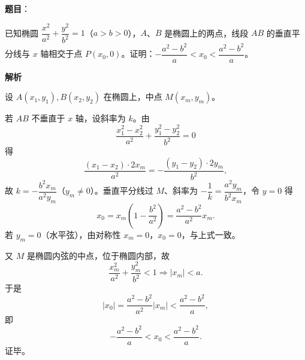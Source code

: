 \begin{answer}

\textbf{题目}：

已知椭圆 \(\dfrac{x^{2}}{a^{2}}+\dfrac{y^{2}}{b^{2}}=1\)（\(a>b>0\)），\(A\)、\(B\) 是椭圆上的两点，线段 \(AB\) 的垂直平分线与 \(x\) 轴相交于点 \(P(x_0,0)\)。证明：\(-\dfrac{a^{2}-b^{2}}{a}<x_0<\dfrac{a^{2}-b^{2}}{a}\)。

\textbf{解析}

设 \(A(x_1,y_1),B(x_2,y_2)\) 在椭圆上，中点 \(M(x_m,y_m)\)。

若 \(AB\) 不垂直于 \(x\) 轴，设斜率为 \(k\)。由
\nopagebreak[4]
\[
\frac{x_1^2-x_2^2}{a^2}+\frac{y_1^2-y_2^2}{b^2}=0
\]
得
\nopagebreak[4]
\[
\frac{(x_1-x_2)\cdot2x_m}{a^2}
=-\frac{(y_1-y_2)\cdot2y_m}{b^2},
\]
故 \(k=-\dfrac{b^2x_m}{a^2y_m}\)（\(y_m\neq0\)）。垂直平分线过 \(M\)、斜率为 \(-\dfrac1k=\dfrac{a^2y_m}{b^2x_m}\)，令 \(y=0\) 得
\nopagebreak[4]
\[
x_0=x_m\left(1-\frac{b^2}{a^2}\right)=\frac{a^2-b^2}{a^2}x_m.
\]
若 \(y_m=0\)（水平弦），由对称性 \(x_m=0\)，\(x_0=0\)，与上式一致。

又 \(M\) 是椭圆内弦的中点，位于椭圆内部，故
\nopagebreak[4]
\[
\frac{x_m^2}{a^2}+\frac{y_m^2}{b^2}<1
\Rightarrow |x_m|<a.
\]
于是
\nopagebreak[4]
\[
|x_0|=\frac{a^2-b^2}{a^2}|x_m|
<\frac{a^2-b^2}{a},
\]
即
\nopagebreak[4]
\[
-\frac{a^2-b^2}{a}<x_0<\frac{a^2-b^2}{a}.
\]
证毕。


\end{answer}